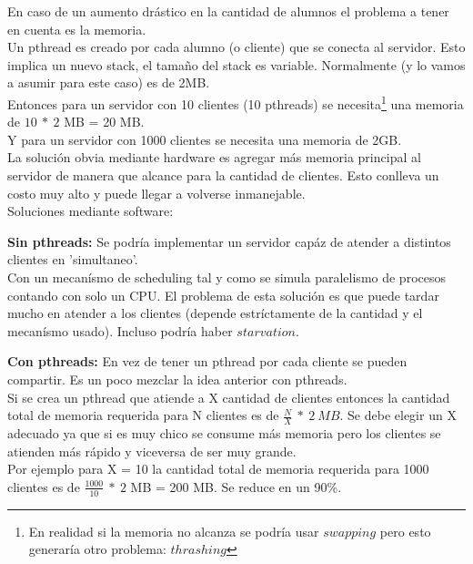 En caso de un aumento drástico en la cantidad de alumnos el problema a tener en cuenta es la memoria.\\

Un pthread es creado por cada alumno (o cliente) que se conecta al servidor. Esto implica un nuevo stack, 
el tamaño del stack es variable. Normalmente (y lo vamos a asumir para este caso) es de 2MB.\\ 

Entonces para un servidor con 10 clientes (10 pthreads) se necesita\footnote{En realidad si la memoria no alcanza se podría usar $swapping$ pero esto generaría otro problema: $thrashing$} %
una memoria de $10\ *\ 2$ MB = 20 MB.\\
Y para un servidor con 1000 clientes se necesita una memoria de 2GB.\\

La solución obvia mediante hardware es agregar más memoria principal al servidor de manera que alcance para la cantidad de clientes.
Esto conlleva un costo muy alto y puede llegar a volverse inmanejable.\\

Soluciones mediante software:
\begin{description}
 \item \textbf{Sin pthreads:} Se podría implementar un servidor capáz de atender a distintos clientes en 'simultaneo'.\\ %
 Con un mecanísmo de scheduling tal y como se simula paralelismo de procesos contando con solo un CPU.
 El problema de esta solución es que puede tardar mucho en atender a los clientes (depende estríctamente de la cantidad y el mecanísmo usado).
 Incluso podría haber $starvation$.
 
 \item \textbf{Con pthreads:} En vez de tener un pthread por cada cliente se pueden compartir. Es un poco mezclar la idea anterior con pthreads.\\
 Si se crea un pthread que atiende a X cantidad de clientes entonces la cantidad total de memoria requerida para N clientes es de $\frac{N}{X}\ *\ 2\ MB$.
 Se debe elegir un X adecuado ya que si es muy chico se consume más memoria pero los clientes se atienden más rápido y viceversa de ser muy grande.\\
 Por ejemplo para X = 10 la cantidad total de memoria requerida para 1000 clientes es de $\frac{1000}{10}\ *\ 2$ MB = 200 MB. Se reduce en un 90\%.
\end{description}